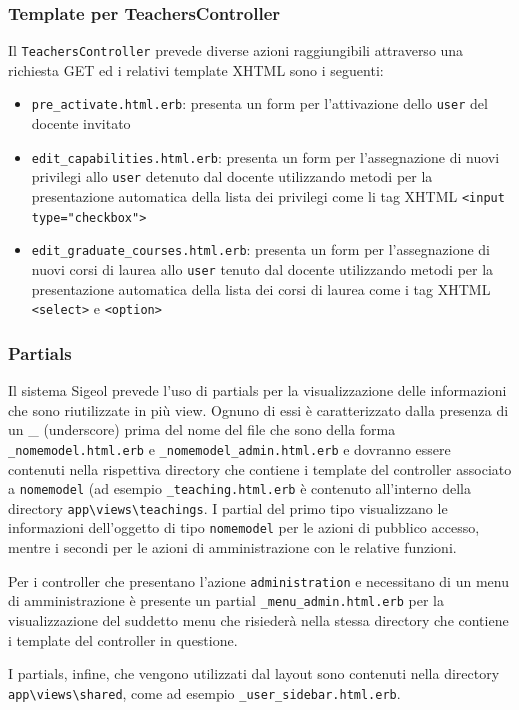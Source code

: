 \documentclass[11pt,a4paper]{article}
\begin{document}
\subsubsection*{Template per TeachersController}
Il \verb|TeachersController| prevede diverse azioni raggiungibili attraverso una richiesta GET ed i relativi template XHTML sono i seguenti:
\begin{itemize}
 \item \verb|pre_activate.html.erb|: presenta un form per l'attivazione dello \verb|user| del docente invitato
 \item \verb|edit_capabilities.html.erb|: presenta un form per l'assegnazione di nuovi privilegi allo \verb|user| detenuto dal docente utilizzando metodi per la presentazione automatica della lista dei privilegi come li tag XHTML \verb|<input type="checkbox">|
 \item \verb|edit_graduate_courses.html.erb|: presenta un form per l'assegnazione di nuovi corsi di laurea allo \verb|user| tenuto dal docente utilizzando metodi per la presentazione automatica della lista dei corsi di laurea come i tag XHTML \verb|<select>| e \verb|<option>|
\end{itemize}
\subsubsection{Partials}
Il sistema Sigeol prevede l'uso di partials per la visualizzazione delle informazioni che sono riutilizzate in più view. Ognuno di essi è caratterizzato dalla presenza di un \_ (underscore) prima del nome del file che sono della forma \verb|_nomemodel.html.erb| e \verb|_nomemodel_admin.html.erb| e dovranno essere contenuti nella rispettiva directory che contiene i template del controller associato a \verb|nomemodel| (ad esempio \verb|_teaching.html.erb| è contenuto all'interno della directory \verb|app\views\teachings|. I partial del primo tipo visualizzano le informazioni dell'oggetto di tipo \verb|nomemodel| per le azioni di pubblico accesso, mentre i secondi per le azioni di amministrazione con le relative funzioni.

Per i controller che presentano l'azione \verb|administration| e necessitano di un menu di amministrazione è presente un partial \verb|_menu_admin.html.erb| per la visualizzazione del suddetto menu che risiederà nella stessa directory che contiene i template del controller in questione.

I partials, infine, che vengono utilizzati dal layout sono contenuti nella directory \verb|app\views\shared|, come ad esempio \verb|_user_sidebar.html.erb|.
\end{document}
